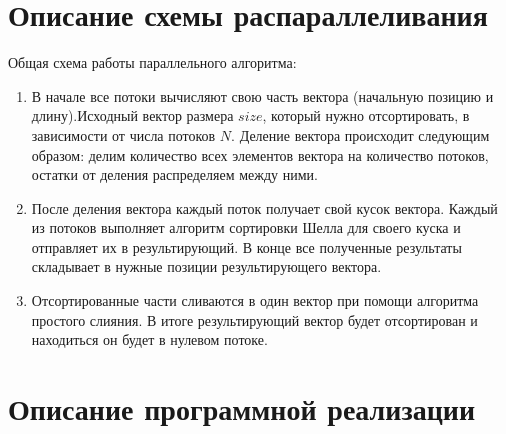 \documentclass{report}
\begin{document}
\section*{Описание схемы распараллеливания}
Общая схема работы параллельного алгоритма:
\begin{enumerate}
\item В начале все потоки вычисляют свою часть вектора (начальную позицию и длину).Исходный вектор размера $size$, который нужно отсортировать, в зависимости от числа потоков $N$. Деление вектора происходит следующим образом: делим количество всех элементов вектора на количество потоков, остатки от деления распределяем между ними.
\item После деления вектора каждый поток получает свой кусок вектора. Каждый из потоков выполняет алгоритм сортировки Шелла для своего куска и отправляет их в результирующий. В конце все полученные результаты складывает в нужные позиции результирующего вектора.
\item Отсортированные части сливаются в один вектор при помощи алгоритма простого слияния. В итоге результирующий вектор будет отсортирован и находиться он будет в нулевом потоке.
\end{enumerate}
\newpage

\section*{Описание программной реализации}
\end{document}
